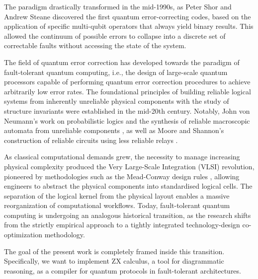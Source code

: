 \documentclass[12pt, twoside, openany]{book}
\begin{document}
The paradigm drastically transformed in the mid-1990s, as Peter Shor \cite{PhysRevA.102.022406} and Andrew Steane \cite{steane1996} discovered the first quantum error-correcting codes, based on the application of specific multi-qubit operators that always yield binary results. This allowed the continuum of possible errors to collapse into a discrete set of correctable faults without accessing the state of the system.

The field of quantum error correction has developed towards the paradigm of fault-tolerant quantum computing, i.e., the design of large-scale quantum processors capable of performing quantum error correction procedures to achieve arbitrarily low error rates. The foundational principles of building reliable logical systems from inherently unreliable physical components with the study of structure invariants were established in the mid-20th century. Notably, John von Neumann's work on probabilistic logics and the synthesis of reliable macroscopic automata from unreliable components \cite{neumann56probabilistic}, as well as Moore and Shannon's construction of reliable circuits using less reliable relays \cite{shannon1938symbolic}.

As classical computational demands grew, the necessity to manage increasing physical complexity produced the Very Large-Scale Integration (VLSI) revolution, pioneered by methodologies such as the Mead-Conway design rules \cite{mead1980introduction}, allowing engineers to abstract the physical components into standardised logical cells. The separation of the logical kernel from the physical layout enables a massive reorganization of computational workflows. Today, fault-tolerant quantum computing is undergoing an analogous historical transition, as the research shifts from the strictly empirical approach to a tightly integrated technology-design co-optimization methodology.

The goal of the present work is completely framed inside this transition. Specifically, we want to implement ZX calculus, a tool for diagrammatic reasoning, as a compiler for quantum protocols in fault-tolerant architectures. 
\end{document}
